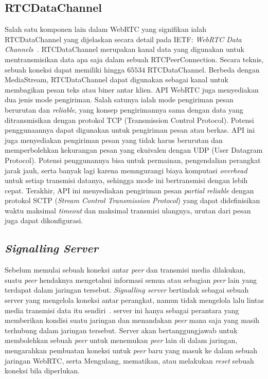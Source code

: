 \subsection{RTCDataChannel}

Salah satu komponen lain dalam WebRTC yang signifikan ialah RTCDataChannel yang dijelaskan secara detail pada IETF: \textit{WebRTC Data Channels}~\citep{rfc8831}. RTCDataChannel merupakan kanal data yang digunakan untuk mentransmisikan data apa saja dalam sebuah RTCPeerConnection. Secara teknis, sebuah koneksi dapat memiliki hingga $65534$ RTCDataChannel. Berbeda dengan MediaStream, RTCDataChannel dapat digunakan sebagai kanal untuk membagikan pesan teks atau biner antar klien. API WebRTC juga menyediakan dua jenis mode pengiriman. Salah satunya ialah mode pengiriman pesan berurutan dan \textit{reliable}, yang konsep pengirimannya sama dengan data yang ditransmisikan dengan protokol TCP (Transmission Control Protocol). Potensi penggunaannya dapat digunakan untuk pengiriman pesan atau berkas. API ini juga menyediakan pengiriman pesan yang tidak harus berurutan dan memperbolehkan kekurangan pesan yang ekuivalen dengan UDP (User Datagram Protocol). Potensi penggunannya bisa untuk permainan, pengendalian perangkat jarak jauh, serta banyak lagi karena memngurangi biaya komputasi \textit{overhead} untuk setiap transmisi datanya, sehingga mode ini bertransmisi dengan lebih cepat. Terakhir, API ini menyediakan pengiriman pesan \textit{partial reliable} dengan protokol SCTP (\textit{Stream Control Transmission Protocol}) yang dapat didefinisikan waktu maksimal \textit{timeout} dan maksimal transmisi ulangnya, urutan dari pesan juga dapat dikonfigurasi.

\subsection{\textit{Signalling Server}}

Sebelum memulai sebuah koneksi antar \textit{peer} dan transmisi media dilakukan, suatu \textit{peer} hendaknya mengetahui informasi semua atau sebagian \textit{peer} lain yang terdapat dalam jaringan tersebut. \textit{Signalling server} bertindak sebagai sebuah server yang mengelola koneksi antar perangkat, namun tidak mengelola lalu lintas media transmisi data itu sendiri~\citep{rfc8839}. server ini hanya sebagai perantara yang memberikan kondisi suatu jaringan dan menandakan \textit{peer} mana saja yang masih terhubung dalam jaringan tersebut. Server akan bertanggungjawab untuk membolehkan sebuah \textit{peer} untuk menemukan \textit{peer} lain di dalam jaringan, mengarahkan pembuatan koneksi untuk \textit{peer} baru yang masuk ke dalam sebuah jaringan WebRTC, serta Mengulang, mematikan, atau melakukan \textit{reset} sebuah koneksi bila diperlukan.

